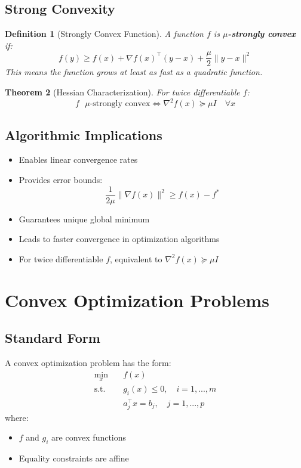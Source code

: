 \documentclass{article}
\theoremstyle{plain}
\newtheorem{theorem}{Theorem}[section]
\newtheorem{definition}[theorem]{Definition}
\begin{document}
\subsection{Strong Convexity}
\begin{definition}[Strongly Convex Function]
A function \( f \) is \textbf{\(\mu\)-strongly convex} if:
\[
f(y) \geq f(x) + \nabla f(x)^\top (y - x) + \frac{\mu}{2}\|y - x\|^2
\]
This means the function grows at least as fast as a quadratic function.
\end{definition}

\begin{theorem}[Hessian Characterization]
For twice differentiable \( f \):
\[
f \text{ \(\mu\)-strongly convex} \iff \nabla^2 f(x) \succeq \mu I \quad \forall x
\]
\end{theorem}

\subsection{Algorithmic Implications}
\begin{itemize}
    \item Enables linear convergence rates
    \item Provides error bounds:
    \[
    \frac{1}{2\mu}\|\nabla f(x)\|^2 \geq f(x) - f^*
    \]
    \item Guarantees unique global minimum
    \item Leads to faster convergence in optimization algorithms
    \item For twice differentiable \( f \), equivalent to \( \nabla^2 f(x) \succeq \mu I \)
\end{itemize}

\section{Convex Optimization Problems}
\subsection{Standard Form}
A convex optimization problem has the form:
\[
\begin{aligned}
\min_{x} \quad & f(x) \\
\text{s.t.} \quad & g_i(x) \leq 0, \quad i = 1,...,m \\
& a_j^\top x = b_j, \quad j = 1,...,p
\end{aligned}
\]
where:
\begin{itemize}
    \item \( f \) and \( g_i \) are convex functions
    \item Equality constraints are affine
\end{itemize}
\end{document}
